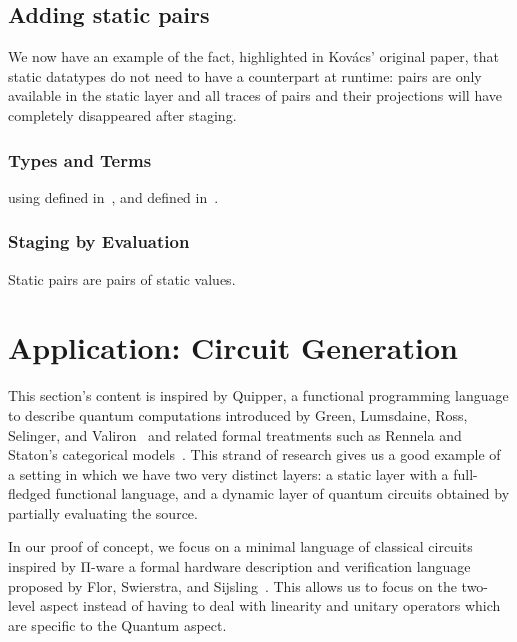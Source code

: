 \documentclass{article}
\begin{document}
\subsection{Adding static pairs}\label{sec:stagingmodelprod}

We now have an example of the fact, highlighted in Kov{\'{a}}cs'
original paper, that static datatypes do not need to have a
counterpart at runtime: pairs are only available in the static
layer and all traces of pairs and their projections will have
completely disappeared after staging.

\subsubsection{Types and Terms}




using  defined in~,
and  defined in~.

\subsubsection{Staging by Evaluation}

Static pairs are pairs of static values.



\section{Application: Circuit Generation}

This section's content is inspired by Quipper, a functional
programming language to describe quantum computations
introduced by Green, Lumsdaine, Ross, Selinger, and
Valiron~\cite{DBLP:conf/rc/GreenLRSV13} and related
formal treatments such as Rennela and Staton's categorical
models~\cite{DBLP:journals/lmcs/RennelaS19}.
%
This strand of research gives us a good example of a setting in which
we have two very distinct layers: a static layer with a
full-fledged functional language, and a dynamic layer of
quantum circuits obtained by partially evaluating the source.

In our proof of concept, we focus on a minimal language of
classical circuits inspired by Π-ware a formal hardware
description and verification language proposed by
Flor, Swierstra, and Sijsling~\cite{DBLP:conf/types/FlorSS15}.
%
This allows us to focus on the two-level aspect instead of
having to deal with linearity and unitary operators which are
specific to the Quantum aspect.
\end{document}
